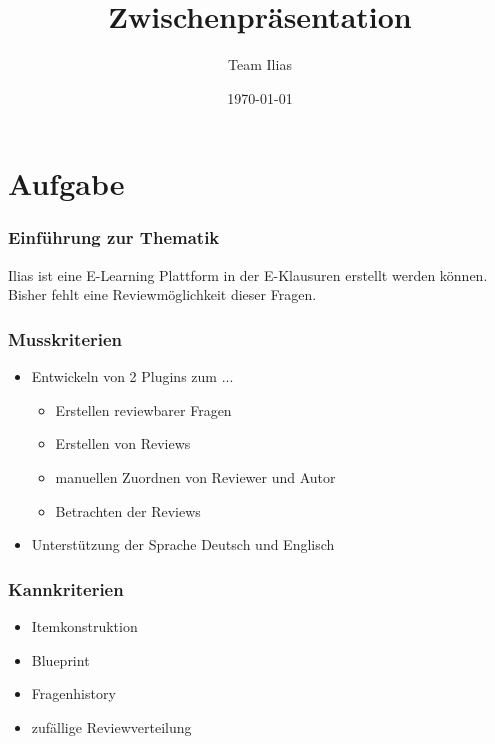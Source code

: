 \documentclass{beamer}
\title{Zwischenpräsentation}
\author{Team Ilias}
\date{\today}
\begin{document}
\maketitle
\frame{\tableofcontents[]}

 
\section{Aufgabe}
\begin{frame} %
  \frametitle{Einführung zur Thematik} %
  	Ilias ist eine E-Learning Plattform in der E-Klausuren 			erstellt werden können.
    Bisher fehlt eine Reviewmöglichkeit dieser Fragen.
\end{frame}

\begin{frame} %
  \frametitle{Musskriterien} %
  \begin{Definition} %
    \begin{itemize}
    		\item Entwickeln von 2 Plugins zum ... 
    			\begin{itemize}
    				 \item Erstellen reviewbarer Fragen
    				 \item Erstellen von Reviews
    				 \item manuellen Zuordnen von Reviewer und Autor
    				 \item Betrachten der Reviews
			\end{itemize}    			
    		\item Unterstützung der Sprache Deutsch und Englisch
    \end{itemize}
  \end{Definition}
\end{frame}

\begin{frame} %
  \frametitle{Kannkriterien} %
  \begin{Definition} %
    \begin{itemize}
    		\item Itemkonstruktion
    		\item Blueprint
    		\item Fragenhistory
    		\item zufällige Reviewverteilung
    \end{itemize}
  \end{Definition}
\end{frame}
\end{document}
